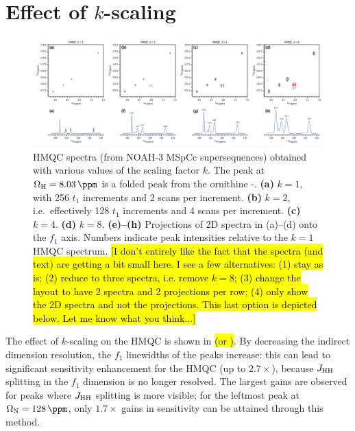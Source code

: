 \section{Effect of \texorpdfstring{$k$}{k}-scaling}

\begin{figure}
    \centering
    \includegraphics[width=\textwidth]{./figures/hmqc_kscale.png}
    \caption{
        \nitrogen{} HMQC spectra (from NOAH-3 MSpCc supersequences) obtained with various values of the scaling factor $k$.
        The peak at $\Omega_{\ce{H}} = \SI{8.03}{\ppm}$ is a folded peak from the ornithine \textdelta-.
        \textbf{(a)} $k = 1$, with 256 $t_1$ increments and 2 scans per increment.
        \textbf{(b)} $k = 2$, i.e.\ effectively 128 $t_1$ increments and 4 scans per increment.
        \textbf{(c)} $k = 4$.
        \textbf{(d)} $k = 8$.
        \textbf{(e)--(h)} Projections of 2D spectra in (a)--(d) onto the $f_1$ axis.
        Numbers indicate peak intensities relative to the $k = 1$ HMQC spectrum.
        \grami{}
        \hl{[I don't entirely like the fact that the spectra (and text) are getting a bit small here. I see a few alternatives: (1) stay as is; (2) reduce to three spectra, i.e. remove $k = 8$; (3) change the layout to have 2 spectra and 2 projections per row; (4) only show the 2D spectra and not the projections. This last option is depicted below. Let me know what you think...]}
    }
    \label{fig:hmqc_kscale}
\end{figure}

The effect of $k$-scaling on the HMQC is shown in  \hl{(or )}.
By decreasing the indirect dimension resolution, the $f_1$ linewidths of the peaks increase: this can lead to significant sensitivity enhancement for the HMQC (up to $2.7 \times$), because $\jhh$ splitting in the $f_1$ dimension is no longer resolved.
The largest gains are observed for peaks where $\jhh$ splitting is more visible; for the leftmost peak at $\Omega_{\ce{N}} = \SI{128}{\ppm}$, only $1.7 \times$ gains in sensitivity can be attained through this method.

